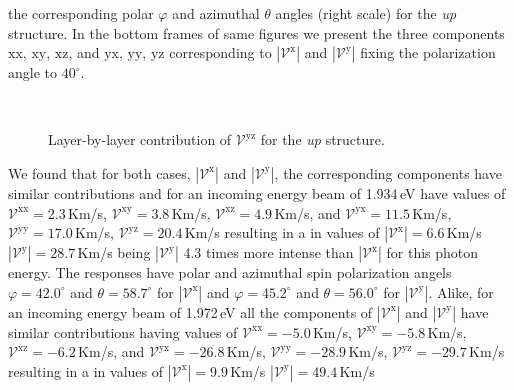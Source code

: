 \documentclass[prb,11pt,tightenlines,twocolumn,aps]{revtex4-1}
\begin{document}
the corresponding polar $\varphi$ and azimuthal $\theta$ angles (right scale)
for the \emph{up} structure. In the bottom frames of same figures we present the
three components $\mathrm{xx}$, $\mathrm{xy}$, $\mathrm{xz}$, and $\mathrm{yx}$,
$\mathrm{yy}$, $\mathrm{yz}$ corresponding to $|\mathcal{V}^{\mathrm{x}}|$ and
$|\mathcal{V}^{\mathrm{y}}|$ fixing the polarization angle to $40^{\circ}$.
\begin{figure}[t]
    \centering
    \\
    \caption{Layer-by-layer contribution of $\mathcal{V}^{\mathrm{yz}}$ for the
     \emph{up} structure.}
    \label{fig:up-vyz-lay}
\end{figure}
We found that for both cases, $|\mathcal{V}^{\mathrm{x}}|$ and
$|\mathcal{V}^{\mathrm{y}}|$, the corresponding components have similar
contributions and for an incoming energy beam of 1.934\,eV have values of
% 
$\mathcal{V}^{\mathrm{xx}}= 2.3$\,Km/s, 
$\mathcal{V}^{\mathrm{xy}}= 3.8$\,Km/s, 
$\mathcal{V}^{\mathrm{xz}}= 4.9$\,Km/s, and
$\mathcal{V}^{\mathrm{yx}}=11.5$\,Km/s,
$\mathcal{V}^{\mathrm{yy}}=17.0$\,Km/s,
$\mathcal{V}^{\mathrm{yz}}=20.4$\,Km/s
resulting in a in values of 
$|\mathcal{V}^{\mathrm{x}}|= 6.6$\,Km/s
$|\mathcal{V}^{\mathrm{y}}|=28.7$\,Km/s
% 
being $|\mathcal{V}^{\mathrm{y}}|$ 4.3 times more intense than
$|\mathcal{V}^{\mathrm{x}}|$ for this photon energy. The responses have polar
and azimuthal spin polarization angels $\varphi= 42.0^{\circ}$ and $\theta=
58.7^{\circ}$ for $|\mathcal{V}^{\mathrm{x}}|$ and $\varphi= 45.2^{\circ}$ and
$\theta= 56.0^{\circ}$ for $|\mathcal{V}^{\mathrm{y}}|$.
% 
Alike, for an incoming energy beam of 1.972\,eV all the components of
$|\mathcal{V}^{\mathrm{x}}|$ and $|\mathcal{V}^{\mathrm{y}}|$ have similar
contributions having values of
% 
$\mathcal{V}^{\mathrm{xx}}= -5.0$\,Km/s, 
$\mathcal{V}^{\mathrm{xy}}= -5.8$\,Km/s, 
$\mathcal{V}^{\mathrm{xz}}= -6.2$\,Km/s, and
$\mathcal{V}^{\mathrm{yx}}=-26.8$\,Km/s,
$\mathcal{V}^{\mathrm{yy}}=-28.9$\,Km/s,
$\mathcal{V}^{\mathrm{yz}}=-29.7$\,Km/s
resulting in a in values of 
$|\mathcal{V}^{\mathrm{x}}|= 9.9$\,Km/s
$|\mathcal{V}^{\mathrm{y}}|=49.4$\,Km/s
\end{document}
